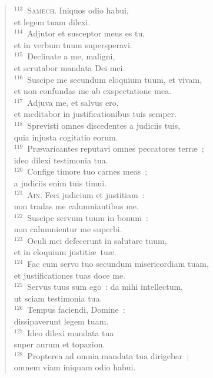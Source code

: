 \begin{flushleft}
\begin{verse}
${}^{113}$~\textsc{Samech.} Iniquos odio habui,\\ et legem tuam dilexi.\\
${}^{114}$~Adjutor et susceptor meus es tu,\\ et in verbum tuum supersperavi.\\
${}^{115}$~Declinate a me, maligni,\\ et scrutabor mandata Dei mei.\\
${}^{116}$~Suscipe me secundum eloquium tuum, et vivam,\\ et non confundas me ab exspectatione mea.\\
${}^{117}$~Adjuva me, et salvus ero,\\ et meditabor in justificationibus tuis semper.\\
${}^{118}$~Sprevisti omnes discedentes a judiciis tuis,\\ quia injusta cogitatio eorum.\\
${}^{119}$~Pr\ae varicantes reputavi omnes peccatores terr\ae~;\\ ideo dilexi testimonia tua.\\
${}^{120}$~Confige timore tuo carnes meas~;\\ a judiciis enim tuis timui.\\
${}^{121}$~\textsc{Ain.} Feci judicium et justitiam~:\\ non tradas me calumniantibus me.\\
${}^{122}$~Suscipe servum tuum in bonum~:\\ non calumnientur me superbi.\\
${}^{123}$~Oculi mei defecerunt in salutare tuum,\\ et in eloquium justiti\ae\ tu\ae .\\
${}^{124}$~Fac cum servo tuo secundum misericordiam tuam,\\ et justificationes tuas doce me.\\
${}^{125}$~Servus tuus sum ego~: da mihi intellectum,\\ ut sciam testimonia tua.\\
${}^{126}$~Tempus faciendi, Domine~:\\ dissipaverunt legem tuam.\\
${}^{127}$~Ideo dilexi mandata tua\\ super aurum et topazion.\\
${}^{128}$~Propterea ad omnia mandata tua dirigebar~;\\ omnem viam iniquam odio habui.\\

\end{verse}
\end{flushleft}

